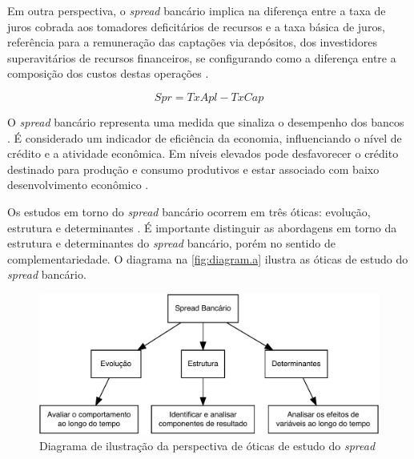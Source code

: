 \documentclass[
  12pt,
  12pt,
  openright,
  oneside,
  a4paper,
  chapter=TITLE,
  section=TITLE,
  subsection=TITLE,
  subsubsection=TITLE,
  portugues,
  sumario=tradicional]{abntex2}
\begin{document}
Em outra perspectiva, o \emph{spread} bancário implica na diferença entre a taxa de juros cobrada aos tomadores deficitários de recursos e a taxa básica de juros, referência para a remuneração das captações via depósitos, dos investidores superavitários de recursos financeiros, se configurando como a diferença entre a composição dos custos destas operações \cite{BCB:1999}.

\begin{equation}
Spr = TxApl - TxCap
\end{equation}

O \emph{spread} bancário representa uma medida que sinaliza o desempenho dos bancos \cite{levine:1997}. É considerado um indicador de eficiência da economia, influenciando o nível de crédito e a atividade econômica. Em níveis elevados pode desfavorecer o crédito destinado para produção e consumo produtivos e estar associado com baixo desenvolvimento econômico \cite{WB:2005}.

Os estudos em torno do \emph{spread} bancário ocorrem em três óticas: evolução, estrutura e determinantes \cite{dick:1999}. É importante distinguir as abordagens em torno da estrutura e determinantes do \emph{spread} bancário, porém no sentido de complementariedade. O diagrama na \autoref{fig:diagram.a} ilustra as óticas de estudo do \emph{spread} bancário.

\begin{figure}[!htbp]
\vspace{20pt}
\caption{Diagrama de ilustração da perspectiva de óticas de estudo do \emph{spread}}
\vspace{-4mm}

\begin{center}\includegraphics{12-exportedfigures/diagram.spread.otic-1} \end{center}
\vspace{-3mm}
\label{fig:diagram.a}
\vspace{-2mm}
\end{figure}
\end{document}
